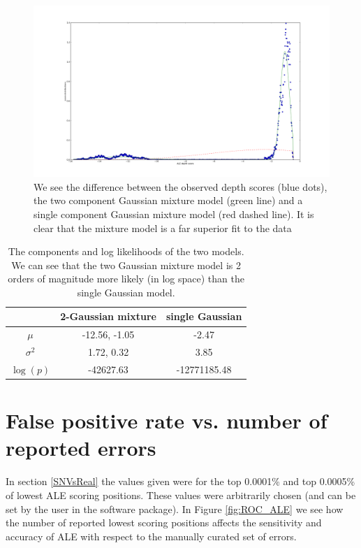 \documentclass[phd,tocprelim]{cornell}
\begin{document}
\begin{figure}[hpt]
 	\centerline{\includegraphics[width=\textwidth]{figures/ALE/gmm_spiro_depth.png}}
    \caption[Example of GMM for ALE depth score]{We see the difference between the observed depth scores (blue dots), the two component Gaussian mixture model (green line) and a single component Gaussian mixture model (red dashed line). It is clear that the mixture model is a far superior fit to the data}
 	\label{fig:GMM_spiro}
\end{figure}

\begin{table}[hpt]

    \begin{center}
    \begin{tabular}{c|c|c}
        & 2-Gaussian mixture & single Gaussian \\
        \hline
        $\mu$ & -12.56, -1.05 & -2.47 \\
        $\sigma^{2}$ & 1.72, 0.32& 3.85 \\
        $\log(p)$ & -42627.63 & -12771185.48
    \end{tabular}
\end{center}
\caption[Example of GMM for ALE depth score]{The components and log likelihoods of the two models. We can see that the two Gaussian mixture model is 2 orders of magnitude more likely (in log space) than the single Gaussian model.}
\label{tab:GMM_spiro}
\end{table}

\section{False positive rate vs. number of reported errors}
\label{ROCALE}

In section \ref{SNVsReal} the values given were for the top 0.0001\% and top 0.0005\% of lowest ALE scoring positions. These values were arbitrarily chosen (and can be set by the user in the software package). In Figure \ref{fig:ROC_ALE} we see how the number of reported lowest scoring positions affects the sensitivity and accuracy of ALE with respect to the manually curated set of errors.
\end{document}
